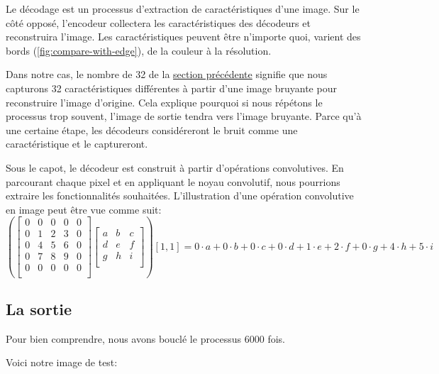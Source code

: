 \documentclass[
  11pt,
  dvipsnames]{article}
\begin{document}
Le décodage est un processus d'extraction de caractéristiques d'une image. Sur le côté opposé, l'encodeur collectera les caractéristiques des décodeurs et reconstruira l'image. Les caractéristiques peuvent être n'importe quoi, varient des bords (\ref{fig:compare-with-edge}), de la couleur à la résolution.

Dans notre cas, le nombre de 32 de la \protect\hyperlink{le-moduxe8le}{section précédente} signifie que nous capturons 32 caractéristiques différentes à partir d'une image bruyante pour reconstruire l'image d'origine. Cela explique pourquoi si nous répétons le processus trop souvent, l'image de sortie tendra vers l'image bruyante. Parce qu'à une certaine étape, les décodeurs considéreront le bruit comme une caractéristique et le captureront.

Sous le capot, le décodeur est construit à partir d'opérations convolutives. En parcourant chaque pixel et en appliquant le noyau convolutif, nous pourrions extraire les fonctionnalités souhaitées. L'illustration d'une opération convolutive en image peut être vue comme suit:
\[\left(\begin{bmatrix}
  0 & 0 & 0 & 0 & 0\\
  0 & 1 & 2 & 3 & 0\\
  0 & 4 & 5 & 6 & 0\\
  0 & 7 & 8 & 9 & 0\\
  0 & 0 & 0 & 0 & 0\\
\end{bmatrix}
\begin{bmatrix}
  a & b & c\\
  d & e & f\\
  g & h & i\\
\end{bmatrix}\right)[1, 1] =
0\cdot a + 0\cdot b + 0\cdot c +
0\cdot d + 1\cdot e + 2\cdot f +
0\cdot g + 4\cdot h + 5\cdot i
\]

\hypertarget{la-sortie}{%
\subsection{La sortie}\label{la-sortie}}

Pour bien comprendre, nous avons bouclé le processus 6000 fois.

Voici notre image de test:
\end{document}
